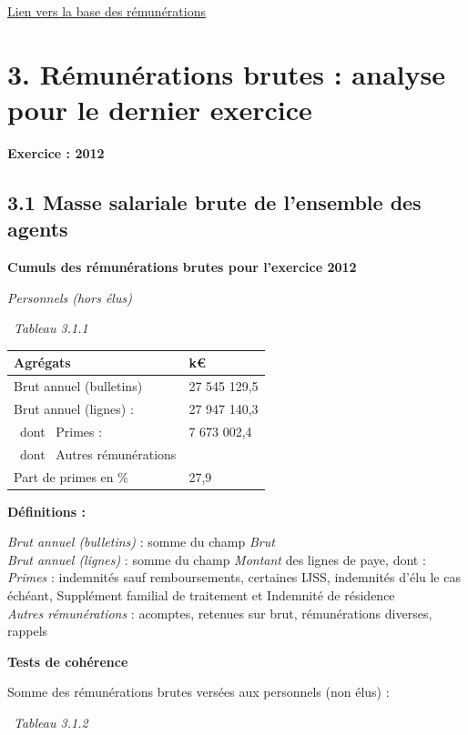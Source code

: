 \href{../Bases/Remunerations/Analyse.remunerations.csv}{Lien vers la base
des rémunérations}

\newpage

\hypertarget{remunerations-brutes-analyse-pour-le-dernier-exercice}{%
\section{3. Rémunérations brutes : analyse pour le dernier
exercice}\label{remunerations-brutes-analyse-pour-le-dernier-exercice}}

\textbf{Exercice : 2012 }

\hypertarget{masse-salariale-brute-de-lensemble-des-agents-1}{%
\subsection{3.1 Masse salariale brute de l'ensemble des
agents}\label{masse-salariale-brute-de-lensemble-des-agents-1}}

\textbf{Cumuls des rémunérations brutes pour l'exercice 2012 }

\emph{Personnels (hors élus)}

~\emph{Tableau 3.1.1}

\begin{longtable}[]{@{}ll@{}}
\toprule
Agrégats & k€\tabularnewline
\midrule
\endhead
Brut annuel (bulletins) & 27 545 129,5\tabularnewline
Brut annuel (lignes) : & 27 947 140,3\tabularnewline
~dont ~Primes : & 7 673 002,4\tabularnewline
~dont ~Autres rémunérations &\tabularnewline
Part de primes en \% & 27,9\tabularnewline
\bottomrule
\end{longtable}

\textbf{Définitions :}

\emph{Brut annuel (bulletins)} : somme du champ \emph{Brut}\\
\emph{Brut annuel (lignes)} : somme du champ \emph{Montant} des lignes
de paye, dont :\\
\emph{Primes} : indemnités sauf remboursements, certaines IJSS,
indemnités d'élu le cas échéant, Supplément familial de traitement et
Indemnité de résidence\\
\emph{Autres rémunérations} : acomptes, retenues sur brut, rémunérations
diverses, rappels

\textbf{Tests de cohérence}

Somme des rémunérations brutes versées aux personnels (non élus) :

~\emph{Tableau 3.1.2}

